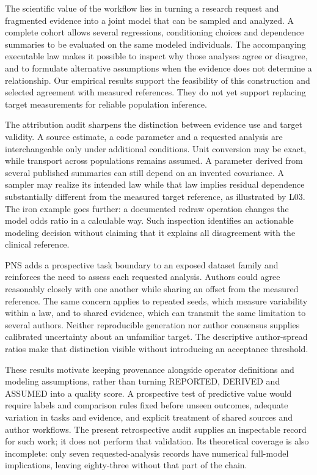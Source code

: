 \documentclass[11pt,letterpaper]{article}
\begin{document}
The scientific value of the workflow lies in turning a research request and fragmented evidence into a joint model that can be sampled and analyzed. A complete cohort allows several regressions, conditioning choices and dependence summaries to be evaluated on the same modeled individuals. The accompanying executable law makes it possible to inspect why those analyses agree or disagree, and to formulate alternative assumptions when the evidence does not determine a relationship. Our empirical results support the feasibility of this construction and selected agreement with measured references. They do not yet support replacing target measurements for reliable population inference.


The attribution audit sharpens the distinction between evidence use and target validity. A source estimate, a code parameter and a requested analysis are interchangeable only under additional conditions. Unit conversion may be exact, while transport across populations remains assumed. A parameter derived from several published summaries can still depend on an invented covariance. A sampler may realize its intended law while that law implies residual dependence substantially different from the measured target reference, as illustrated by L03. The iron example goes further: a documented redraw operation changes the model odds ratio in a calculable way. Such inspection identifies an actionable modeling decision without claiming that it explains all disagreement with the clinical reference.


PNS adds a prospective task boundary to an exposed dataset family and reinforces the need to assess each requested analysis. Authors could agree reasonably closely with one another while sharing an offset from the measured reference. The same concern applies to repeated seeds, which measure variability within a law, and to shared evidence, which can transmit the same limitation to several authors. Neither reproducible generation nor author consensus supplies calibrated uncertainty about an unfamiliar target. The descriptive author-spread ratios make that distinction visible without introducing an acceptance threshold.


These results motivate keeping provenance alongside operator definitions and modeling assumptions, rather than turning REPORTED, DERIVED and ASSUMED into a quality score. A prospective test of predictive value would require labels and comparison rules fixed before unseen outcomes, adequate variation in tasks and evidence, and explicit treatment of shared sources and author workflows. The present retrospective audit supplies an inspectable record for such work; it does not perform that validation. Its theoretical coverage is also incomplete: only seven requested-analysis records have numerical full-model implications, leaving eighty-three without that part of the chain.
\end{document}
